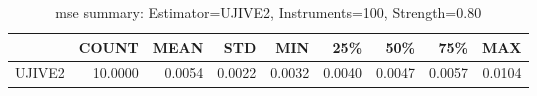 \begin{table}[ht]
\centering
\caption{mse summary: Estimator=UJIVE2, Instruments=100, Strength=0.80}
\begin{tabular}{lrrrrrrrr}
\toprule
 & COUNT & MEAN & STD & MIN & 25\% & 50\% & 75\% & MAX \\
\midrule
UJIVE2 & 10.0000 & 0.0054 & 0.0022 & 0.0032 & 0.0040 & 0.0047 & 0.0057 & 0.0104 \\
\bottomrule
\end{tabular}
\end{table}
